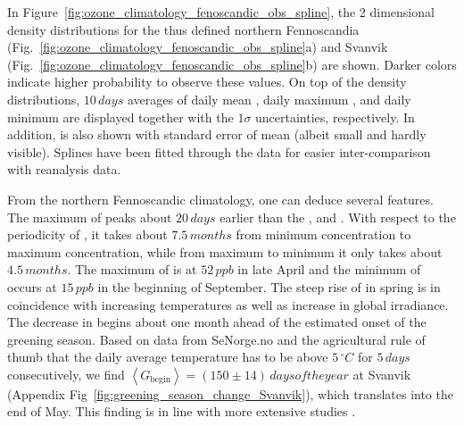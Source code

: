 \documentclass[bg, manuscript]{copernicus}
\begin{document}
In Figure~\ref{fig:ozone_climatology_fenoscandic_obs_spline}, the 2 dimensional density distributions for the thus defined northern Fennoscandia (Fig.~\ref{fig:ozone_climatology_fenoscandic_obs_spline}a) and Svanvik (Fig.~\ref{fig:ozone_climatology_fenoscandic_obs_spline}b) are shown. Darker colors indicate higher probability to observe these values. On top of the density distributions, $10\,\unit{days}$ averages of daily mean , daily maximum , and daily minimum  are displayed together with the $1 \sigma$ uncertainties, respectively. In addition,  is also shown with standard error of mean (albeit small and hardly visible). Splines have been fitted through the data for easier inter-comparison with reanalysis data.

From the northern Fennoscandic climatology, one can deduce several features. The maximum of  peaks about $20\,\unit{days}$ earlier than the , and . With respect to the periodicity of , it takes about $7.5\,\unit{months}$ from minimum concentration to maximum concentration, while from maximum to minimum it only takes about $4.5\,\unit{months}$. The maximum of  is at $52\,\unit{ppb}$ in late April and the minimum of  occurs at $15\,\unit{ppb}$ in the beginning of September. The steep rise of  in spring is in coincidence with increasing temperatures as well as increase in global irradiance. The decrease in  begins about one month ahead of the estimated onset of the greening season. Based on data from SeNorge.no and the agricultural rule of thumb that the daily average temperature has to be above $5\,\unit{^\circ C}$ for $5\,\unit{days}$ consecutively, we find $\left<G_\mathrm{begin}\right> = (150 \pm 14)\,\unit{days of the year}$ at Svanvik (Appendix Fig~\ref{fig:greening_season_change_Svanvik}), which translates into the end of May. This finding is in line with more extensive studies \citep[][e.g.,]{IJB:Karlsen2007,AFM:Linderholm}.
\end{document}
